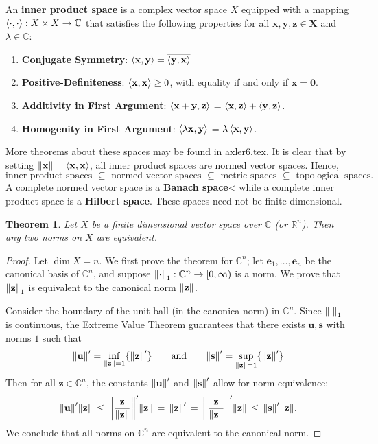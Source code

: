 \documentclass[11pt]{article}
\newtheorem{theorem}{Theorem}
\renewcommand{\vec}[1]{\mathbf{#1}}
\newcommand{\conjugate}[1]{\overline{#1}}
\begin{document}
An \textbf{inner product space} is a complex vector space $X$ equipped with a mapping $\ev{\cdot, \cdot} : X \times X \to \mathbb{C}$ that satisfies the following properties for all $\vec{x}, \vec{y}, \vec{z} \in \vec{X}$ and $\lambda \in \mathbb{C}$:
\begin{enumerate}
	\item \textbf{Conjugate Symmetry}: $\ev{\vec{x}, \vec{y}} = \conjugate{\ev{\vec{y}, \vec{x}}}$
	\item \textbf{Positive-Definiteness}: $\ev{\vec{x}, \vec{x}} \ge 0$, with equality if and only if $\vec{x} = \vec{0}$.
	\item \textbf{Additivity in First Argument}: $\ev{\vec{x} + \vec{y}, \vec{z}}$ = $\ev{\vec{x}, \vec{z}} + \ev{\vec{y}, \vec{z}}$.
	\item \textbf{Homogenity in First Argument}: $\ev{\lambda \vec{x}, \vec{y}}$ = $\lambda \ev{\vec{x}, \vec{y}}$.
\end{enumerate}
More theorems about these spaces may be found in axler6.tex. It is clear that by setting $\norm{\vec{x}} = \ev{\vec{x}, \vec{x}}$, all inner product spaces are normed vector spaces. Hence,
\[
  \text{inner product spaces } \subseteq \text{ normed vector spaces } \subseteq \text{ metric spaces } \subseteq \text{ topological spaces}.
\]
A complete normed vector space is a \textbf{Banach space}< while a complete inner product space is a \textbf{Hilbert space}. These spaces need not be finite-dimensional.

\begin{theorem}
  Let $X$ be a finite dimensional vector space over $\mathbb{C}$ (or $\mathbb{R}^{n}$). Then any two norms on $X$ are equivalent.
\end{theorem}
\begin{adjustwidth}{0.5cm}{}
  \begin{proof}
    Let $\dim X = n$. We first prove the theorem for $\mathbb{C}^{n}$; let $\vec{e}_{1}, \ldots, \vec{e}_{n}$ be the canonical basis of $\mathbb{C}^{n}$, and suppose $\norm{\cdot}_{1} : \mathbb{C}^{n} \to [0, \infty)$ is a norm. We prove that $\norm{\vec{z}}_{1}$ is equivalent to the canonical norm $\norm{\vec{z}}$.
    
    Consider the boundary of the unit ball (in the canonica norm) in $\mathbb{C}^{n}$. Since $\norm{\cdot}_{1}$ is continuous, the Extreme Value Theorem guarantees that there exists $\vec{u}, \vec{s}$ with norms $1$ such that 
    \[
      \norm{\vec{u}}' = \inf\limits_{\norm{\vec{z}} = 1} \{  \norm{\vec{z}}' \} \qquad \text{and} \qquad \norm{\vec{s}}' = \sup\limits_{\norm{\vec{z}} = 1} \{ \norm{\vec{z}}' \}
    \]
    Then for all $\vec{z} \in \mathbb{C}^{n}$, the constants $\norm{\vec{u}}'$ and $\norm{\vec{s}}'$ allow for norm equivalence:
    \[
      \norm{\vec{u}}' \norm{\vec{z}} \, \le \, \norm{\frac{\vec{z}}{\norm{\vec{z}}}}' \norm{\vec{z}} \, = \, \norm{\vec{z}}' \, = \, \norm{\frac{\vec{z}}{\norm{\vec{z}}}}' \norm{\vec{z}} \, \le \, \norm{\vec{s}}' \norm{\vec{z}}.
    \]
    We conclude that all norms on $\mathbb{C}^{n}$ are equivalent to the canonical norm.
  \end{proof}
\end{adjustwidth}
\end{document}
